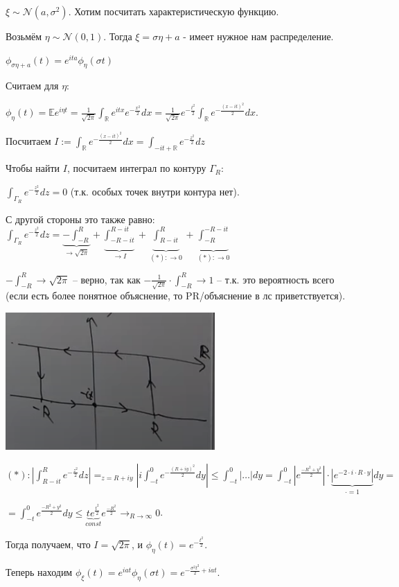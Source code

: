 \begin{example}
    $\xi \sim \mathcal{N}(a, \sigma^2)$. Хотим посчитать характеристическую функцию.

    Возьмём $\eta \sim \mathcal{N}(0, 1)$. Тогда $\xi = \sigma \eta + a$ - имеет нужное нам распределение.

    $\phi_{\sigma \eta + a}(t) = e^{ita} \phi_{\eta} (\sigma t)$

    Считаем для $\eta$:

    $\phi_{\eta}(t) = \mathbb{E} e^{i \eta t} = \frac{1}{\sqrt{2 \pi}} \int_{\mathbb{R}} e^{i t x} e^{-\frac{x^2}{2}} dx = \frac{1}{\sqrt{2 \pi}} e^{-\frac{t^2}{2}} \int_{\mathbb{R}} e^{- \frac{(x - it)^2}{2}} dx$.

    Посчитаем $I := \int_{\mathbb{R}} e^{-\frac{(x - it)^2}{2}} dx = \int_{-it + \mathbb{R}} e^{-\frac{z^2}{2}} dz$

    Чтобы найти $I$, посчитаем интеграл по контуру $\Gamma_R$:

    $\int_{\Gamma_R} e^{-\frac{z^2}{2}} dz = 0$ (т.к. особых точек внутри контура нет).

    С другой стороны это также равно: $\int_{\Gamma_R} e^{-\frac{z^2}{2}} dz = \underbrace{-\int_{-R}^{R}}_{\to \sqrt{2 \pi}} + \underbrace{\int_{-R - it}^{R - it}}_{\to I} + \underbrace{\int_{R - it}^{R}}_{(*): \to 0} + \underbrace{\int_{-R}^{-R - it}}_{(*): \to 0}$

    $-\int_{-R}^{R} \to \sqrt{2 \pi}$ -- верно, так как $-\frac{1}{\sqrt{2 \pi}} \cdot \int_{-R}^{R} \to 1$ -- т.к. это вероятность всего (если есть более понятное объяснение, то PR/объяснение в лс приветствуется).

    \begin{center}
        \includegraphics[width=8cm]{./assets/03-characteristic-funcs/complex-arbitrary-value-example-1.png}
    \end{center}

    $(*): \left| \int_{R - it}^{R} e^{-\frac{z^2}{2}} dz \right| =_{z = R + i y} \left| i \int_{-t}^{0} e^{- \frac{(R + iy)^2}{2}} dy \right| \leq \int_{-t}^{0} |\ldots|dy = \int_{-t}^{0} \left|e^{\frac{-R^2 + y^2}{2}}\right| \cdot \underbrace{\left|e^{-2 \cdot i \cdot R \cdot y}\right|}_{\cdot = 1} dy =$

    $= \int_{-t}^{0} e^{\frac{-R^2 + y^2}{2}} dy \leq \underbrace{t e^{\frac{t^2}{2}}}_{const} e^{\frac{-R^2}{2}} \rightarrow_{R \to \infty} 0$.


    Тогда получаем, что $I = \sqrt{2 \pi}$, и $\phi_{\eta}(t) = e^{-\frac{t^2}{2}}$.


    Теперь находим $\phi_{\xi}(t) = e^{iat} \phi_{\eta}(\sigma t) = e^{- \frac{\sigma^2 t^2}{2} + iat}$.
\end{example}

